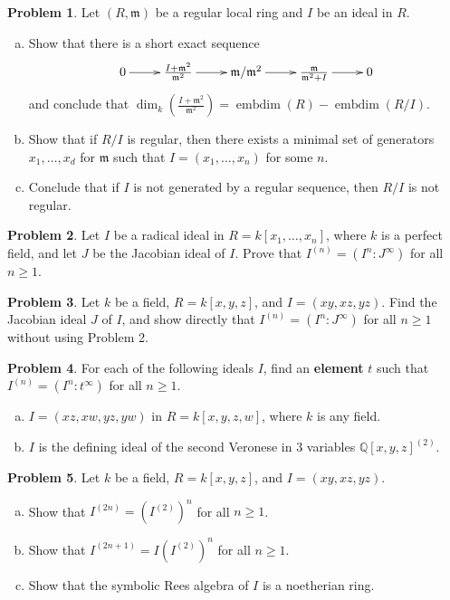 \documentclass[11pt]{article}
\DeclareMathOperator{\embdim}{embdim}
\newcommand{\m}{\mathfrak{m}}
\theoremstyle{definition}
\newtheorem{problem}{Problem}
\begin{document}
\begin{problem}
	Let $(R, \m)$ be a regular local ring and $I$ be an ideal in $R$.
	\begin{enumerate}[a)]
		\item Show that there is a short exact sequence
		$$\xymatrix{0 \ar[r] & \frac{I+\m^2}{\m^2} \ar[r] & \m/\m^2 \ar[r] & \frac{\m}{\m^2+I} \ar[r] & 0}$$
		and conclude that $\dim_k \left( \frac{I+\m^2}{\m^2}\right) = \embdim(R) - \embdim(R/I)$.
		\item Show that if $R/I$ is regular, then there exists a minimal set of generators $x_1, \ldots, x_d$ for $\m$ such that $I = (x_1, \ldots, x_n)$ for some $n$.
		\item Conclude that if $I$ is not generated by a regular sequence, then $R/I$ is not regular.
	\end{enumerate}
\end{problem}


\begin{problem}
	Let $I$ be a radical ideal in $R = k[x_1, \ldots, x_n]$, where $k$ is a perfect field, and let $J$ be the Jacobian ideal of $I$. Prove that $I^{(n)} = (I^n : J^\infty)$ for all $n \geqslant 1$.
\end{problem}


\begin{problem}
	 Let $k$ be a field, $R = k[x,y,z]$, and $I = (xy,xz,yz)$. Find the Jacobian ideal $J$ of $I$, and show directly that $I^{(n)} = (I^n : J^\infty)$ for all $n \geqslant 1$ without using Problem 2.
\end{problem}


\begin{problem}
	For each of the following ideals $I$, find an {\bf element} $t$ such that $I^{(n)} = (I^n : t^\infty)$ for all $n \geqslant 1$.
	\begin{enumerate}[a)]
		\item $I = (xz,xw,yz,yw)$ in $R = k[x,y,z,w]$, where $k$ is any field.
		\item $I$ is the defining ideal of the second Veronese in $3$ variables $\mathbb{Q}[x,y,z]^{(2)}$.
	\end{enumerate}
\end{problem}

\newpage

\begin{problem}
	Let $k$ be a field, $R = k[x,y,z]$, and $I = (xy,xz,yz)$.
	\begin{enumerate}[a)]
		\item Show that $I^{(2n)} = \left( I^{(2)} \right)^n$ for all $n \geqslant 1$.
		\item Show that $I^{(2n+1)} = I \left( I^{(2)} \right)^n$ for all $n \geqslant 1$.
		\item Show that the symbolic Rees algebra of $I$ is a noetherian ring.
	\end{enumerate}
\end{problem}
\end{document}
